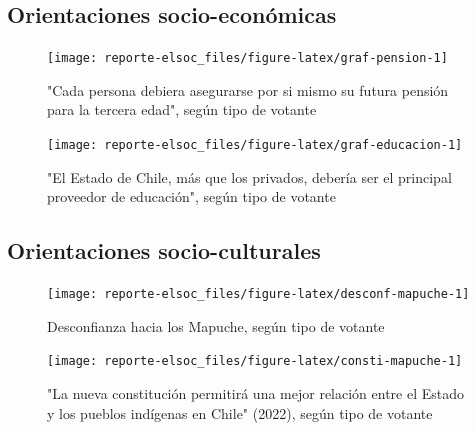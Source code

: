 \documentclass[
  12pt,
]{book}
\begin{document}
\hypertarget{orientaciones-socio-econuxf3micas}{%
\subsection{Orientaciones socio-económicas}\label{orientaciones-socio-econuxf3micas}}

\begin{figure}

{\centering \texttt{[image: reporte-elsoc\_files/figure-latex/graf-pension-1]} 

}

\caption{"Cada persona debiera asegurarse por si mismo su futura pensión para la tercera edad", según tipo de votante}\label{fig:graf-pension}
\end{figure}

\begin{figure}

{\centering \texttt{[image: reporte-elsoc\_files/figure-latex/graf-educacion-1]} 

}

\caption{"El Estado de Chile, más que los privados, debería ser el principal proveedor de educación", según tipo de votante}\label{fig:graf-educacion}
\end{figure}

\hypertarget{orientaciones-socio-culturales}{%
\subsection{Orientaciones socio-culturales}\label{orientaciones-socio-culturales}}

\begin{figure}

{\centering \texttt{[image: reporte-elsoc\_files/figure-latex/desconf-mapuche-1]} 

}

\caption{Desconfianza hacia los Mapuche, según tipo de votante}\label{fig:desconf-mapuche}
\end{figure}

\begin{figure}

{\centering \texttt{[image: reporte-elsoc\_files/figure-latex/consti-mapuche-1]} 

}

\caption{"La nueva constitución permitirá una mejor relación entre el Estado y los pueblos indígenas en Chile" (2022), según tipo de votante}\label{fig:consti-mapuche}
\end{figure}
\end{document}
